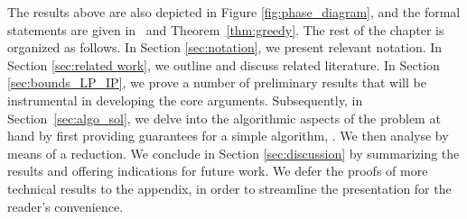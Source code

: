 
\noindent
The results above are also depicted in Figure \ref{fig:phase_diagram}, and the formal statements are given in~ and Theorem~\ref{thm:greedy}. The rest of the chapter is organized as follows. 
In Section \ref{sec:notation}, we present relevant notation. In Section \ref{sec:related work}, we outline and discuss related literature. 
In Section \ref{sec:bounds_LP_IP}, we prove a number of preliminary results that will be instrumental in developing the core arguments. 
Subsequently, in Section~\ref{sec:algo_sol}, we delve into the algorithmic aspects of the problem at hand by first providing guarantees for a simple algorithm, \bgreedy. We then analyse \greedy by means of a reduction. 
We conclude in Section \ref{sec:discussion} by summarizing the results and offering indications for future work. We defer the proofs of more technical results to the appendix, in order to streamline the presentation for the reader's convenience.

